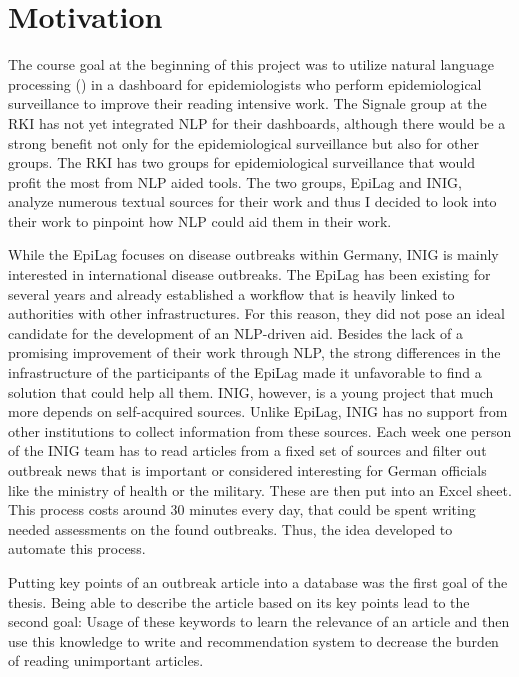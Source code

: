 \section{Motivation}
The course goal at the beginning of this project was to utilize natural language
processing () in a dashboard for epidemiologists who perform epidemiological
surveillance to improve their reading intensive work.
The Signale group at the RKI has not yet integrated NLP for their dashboards, although there would be a strong benefit not only for the epidemiological surveillance but also for other groups. The RKI has two groups for epidemiological surveillance that would profit the most from NLP aided tools. The two groups, EpiLag and INIG, analyze numerous textual sources for their work and thus I decided to look into their work to pinpoint how NLP could aid them in their work.

While the EpiLag focuses on disease outbreaks within Germany, INIG is mainly interested in international disease outbreaks. The
EpiLag has been existing for several years and already established a workflow that is heavily linked to authorities with other infrastructures. For this reason, they did not pose an ideal candidate for the development of an NLP-driven aid. Besides the lack of a promising improvement of their work through NLP, the strong differences in the infrastructure of the participants of the EpiLag made it unfavorable to find a solution that could help all them.
INIG, however, is a young project that much more depends on self-acquired sources. Unlike EpiLag, INIG
has no support from other institutions to collect information from these sources.
Each week one person of the INIG team has to read articles from a fixed set of sources and filter out outbreak news that is
important or considered interesting for German officials like the ministry of health or the military. These are then put into an Excel sheet. This process costs around 30 minutes
every day, that could be spent writing needed assessments on the found outbreaks. Thus, the idea developed to automate this process.

Putting key points of an outbreak article
into a database was the first goal of the thesis. Being able to describe the article based on its key points lead to the second goal: Usage of these keywords to learn the relevance of an article and then use this knowledge to write
and recommendation system to decrease the burden of reading unimportant articles.
